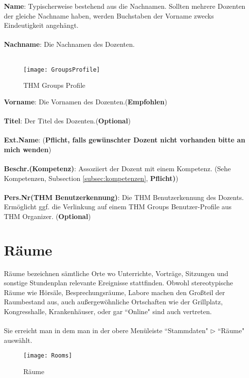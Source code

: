 \documentclass[]{report}
\begin{document}
\noindent
\textbf{Name}: Typischerweise bestehend aus die Nachnamen. Sollten mehrere Dozenten der gleiche Nachname haben, werden Buchstaben der Vorname zwecks Eindeutigkeit angehängt. \\
\\
\textbf{Nachname}: Die Nachnamen des Dozenten.\\
\\
\begin{wrapfigure}{r}{0.4\textwidth}
	\vspace{-10pt}
	\texttt{[image: GroupsProfile]}
	\vspace{-5pt}
	\caption{THM Groups Profile}
	\label{fig:thmgroupsprofile}
\end{wrapfigure}
\textbf{Vorname}: Die Vornamen des Dozenten.(\textbf{Empfohlen})\\
\\
\textbf{Titel}: Der Titel des Dozenten.(\textbf{Optional})\\
\\
\textbf{Ext.Name}: (\textbf{Pflicht, falls gewünschter Dozent nicht vorhanden bitte an mich wenden})\\
\\
\textbf{Beschr.(Kompetenz)}: Assoziiert der Dozent mit einem Kompetenz. (Sehe Kompetenzen, Subsection  \ref{subsec:kompetenzen}, \textbf{Pflicht)})\\
\\
\textbf{Pers.Nr(THM Benutzerkennung)}: Die THM Benutzerkennung des Dozents. Ermöglicht ggf. die Verlinkung auf einem THM Groups Benutzer-Profile aus THM Organizer. (\textbf{Optional})\\

\newpage
\section{Räume}

Räume bezeichnen sämtliche Orte wo Unterrichte, Vorträge, Sitzungen und sonstige Stundenplan relevante Ereignisse stattfinden. Obwohl stereotypische Räume wie Hörsäle, Besprechungsräume, Labore machen den Großteil der Raumbestand aus, auch außergewöhnliche Ortschaften wie der Grillplatz, Kongresshalle, Krankenhäuser, oder gar ``Online" sind auch vertreten.\\
\\
Sie erreicht man in dem man in der obere Menüleiste ``Stammdaten" $\triangleright$ ``Räume" auswählt.

\begin{figure}[h]
	\texttt{[image: Rooms]}
	\vspace{-15pt}
	\caption{Räume}
	\label{fig:rooms}
\end{figure}
\end{document}
